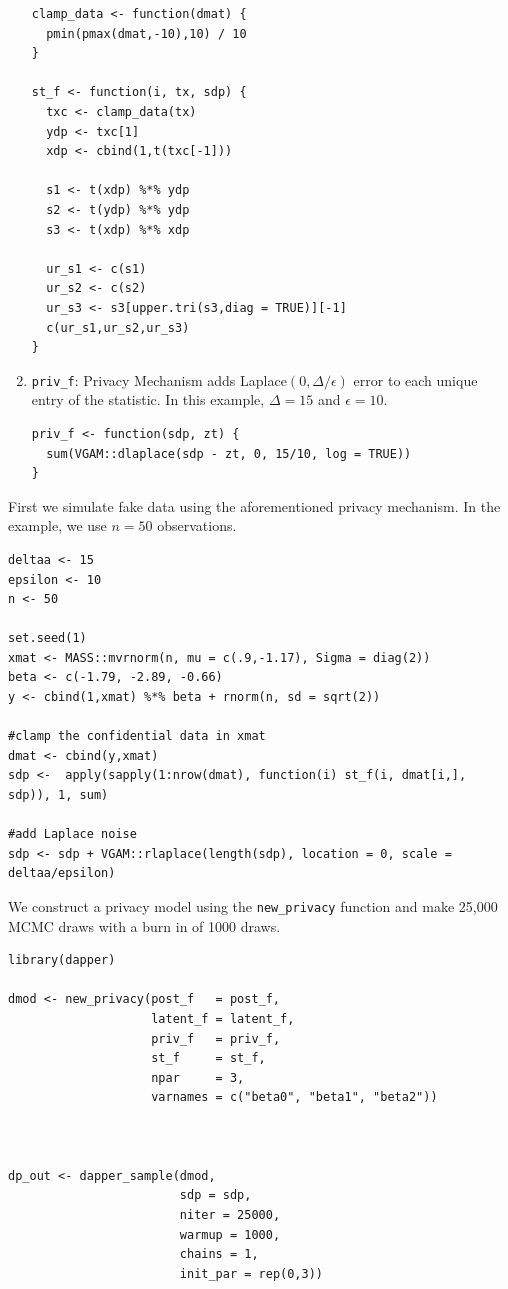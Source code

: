 \begin{enumerate}
\begin{verbatim}
clamp_data <- function(dmat) {
  pmin(pmax(dmat,-10),10) / 10
}

st_f <- function(i, tx, sdp) {
  txc <- clamp_data(tx)
  ydp <- txc[1]
  xdp <- cbind(1,t(txc[-1]))

  s1 <- t(xdp) %*% ydp
  s2 <- t(ydp) %*% ydp
  s3 <- t(xdp) %*% xdp

  ur_s1 <- c(s1)
  ur_s2 <- c(s2)
  ur_s3 <- s3[upper.tri(s3,diag = TRUE)][-1]
  c(ur_s1,ur_s2,ur_s3)
}
\end{verbatim}
\item
  \texttt{priv\_f}: Privacy Mechanism
  adds Laplace\((0, \Delta/\epsilon)\) error to each unique entry
  of the statistic. In this example, \(\Delta = 15\) and \(\epsilon = 10\).

\begin{verbatim}
priv_f <- function(sdp, zt) {
  sum(VGAM::dlaplace(sdp - zt, 0, 15/10, log = TRUE))
}
\end{verbatim}
\end{enumerate}

First we simulate fake data using the aforementioned privacy mechanism.
In the example, we use \(n = 50\) observations.

\begin{verbatim}
deltaa <- 15
epsilon <- 10
n <- 50

set.seed(1)
xmat <- MASS::mvrnorm(n, mu = c(.9,-1.17), Sigma = diag(2))
beta <- c(-1.79, -2.89, -0.66)
y <- cbind(1,xmat) %*% beta + rnorm(n, sd = sqrt(2))

#clamp the confidential data in xmat
dmat <- cbind(y,xmat)
sdp <-  apply(sapply(1:nrow(dmat), function(i) st_f(i, dmat[i,], sdp)), 1, sum)

#add Laplace noise 
sdp <- sdp + VGAM::rlaplace(length(sdp), location = 0, scale = deltaa/epsilon)
\end{verbatim}

We construct a privacy model using the \texttt{new\_privacy} function and
make 25,000 MCMC draws with a burn in of 1000 draws.

\begin{verbatim}
library(dapper)

dmod <- new_privacy(post_f   = post_f,
                    latent_f = latent_f,
                    priv_f   = priv_f,
                    st_f     = st_f,
                    npar     = 3,
                    varnames = c("beta0", "beta1", "beta2"))



dp_out <- dapper_sample(dmod,
                        sdp = sdp,
                        niter = 25000,
                        warmup = 1000,
                        chains = 1,
                        init_par = rep(0,3))
\end{verbatim}

